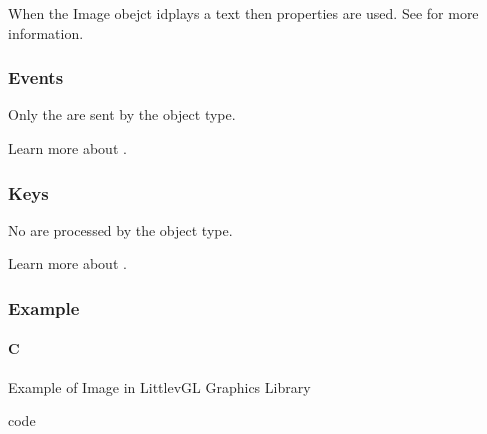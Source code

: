 \documentclass[letterpaper,10pt,english]{sphinxmanual}
\begin{document}
When the Image obejct idplays a text then  properties are used. See {\hyperref[\detokenize{object-types/label::doc}]{}} for more information.


\subsubsection{Events}
\label{\detokenize{object-types/img:events}}
Only the  are sent by the object type.

Learn more about {\hyperref[\detokenize{overview/events::doc}]{}}.


\subsubsection{Keys}
\label{\detokenize{object-types/img:keys}}
No  are processed by the object type.

Learn more about {\hyperref[\detokenize{overview/indev::doc}]{}}.


\subsubsection{Example}
\label{\detokenize{object-types/img:example}}

\paragraph{C}
\label{\detokenize{object-types/img:c}}
Example of Image in LittlevGL Graphics Library 

code
\end{document}
